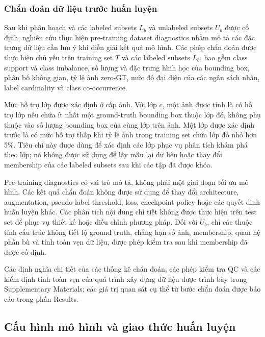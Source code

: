 \documentclass[pdflatex,sn-mathphys-num]{sn-jnl}%
\theoremstyle{thmstyleone}%
\theoremstyle{thmstyletwo}%
\theoremstyle{thmstylethree}%
\begin{document}
\subsubsection{Chẩn đoán dữ liệu trước huấn luyện}
\label{subsec:pretraining_dataset_diagnostics}

Sau khi phân hoạch và các labeled subsets \(L_b\) và unlabeled subsets \(U_b\) được cố định, nghiên
cứu thực hiện pre-training dataset diagnostics nhằm mô tả các đặc trưng dữ
liệu cần lưu ý khi diễn giải kết quả mô hình. Các phép chẩn đoán được thực
hiện chủ yếu trên training set \(T\) và các labeled subsets \(L_b\), bao
gồm class support và class imbalance, số lượng và đặc trưng hình học của
bounding box, phân bố không gian, tỷ lệ ảnh zero-GT, mức độ đại diện của
các ngân sách nhãn, label cardinality và class co-occurrence.

Mức hỗ trợ lớp được xác định ở cấp ảnh. Với lớp \(c\), một ảnh được tính
là có hỗ trợ lớp nếu chứa ít nhất một ground-truth bounding box thuộc lớp
đó, không phụ thuộc vào số lượng bounding box của cùng lớp trên ảnh. Một
lớp được xác định trước là có mức hỗ trợ thấp khi tỷ lệ ảnh trong training
set chứa lớp đó nhỏ hơn 5\%. Tiêu chí này được dùng để xác định các lớp
phục vụ phân tích khám phá theo lớp; nó không được sử dụng để lấy mẫu lại
dữ liệu hoặc thay đổi membership của các labeled subsets sau khi các tập
đã được khóa.

Pre-training diagnostics có vai trò mô tả, không phải một giai đoạn tối ưu
mô hình. Các kết quả chẩn đoán không được sử dụng để thay đổi architecture,
augmentation, pseudo-label threshold, loss, checkpoint policy hoặc các
quyết định huấn luyện khác. Các phân tích nội dung chi tiết không được thực
hiện trên test set để phục vụ thiết kế hoặc điều chỉnh phương pháp. Đối với
\(U_b\), chỉ các thuộc tính cấu trúc không tiết lộ ground truth, chẳng hạn
số ảnh, membership, quan hệ phần bù và tính toàn vẹn dữ liệu, được phép
kiểm tra sau khi membership đã được cố định.

Các định nghĩa chi tiết của các thống kê chẩn đoán, các phép kiểm tra QC
và các kiểm định tính toàn vẹn của quá trình xây dựng dữ liệu được trình
bày trong Supplementary Materials; các giá trị quan sát cụ thể từ bước
chẩn đoán được báo cáo trong phần Results.

\subsection{Cấu hình mô hình và giao thức huấn luyện}
\label{subsec:model_training_protocol}
\end{document}
